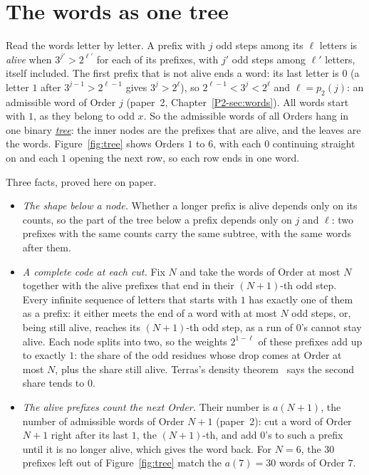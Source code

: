 \documentclass[10pt,a4paper,titlepage]{article}
\makeatletter
\newcommand{\termhere}[1]{\leavevmode
  \Hy@raisedlink{\hyper@anchorstart{term:#1}\hyper@anchorend}}
\newcommand{\keyterm}[2]{\hyperlink{box:#1}{\emph{#2}}}
\makeatother
\begin{document}
\section{The words as one tree}
\label{sec:tree}

\termhere{tree}Read the words letter by letter. A prefix with $j$ odd steps among its $\ell$ letters is \emph{alive}
when $3^{j'} > 2^{\ell'}$ for each of its prefixes, with $j'$ odd steps among $\ell'$ letters, itself included.
The first prefix that is not alive ends a word: its last letter is $0$ (a letter $1$ after
$3^{j-1} > 2^{\ell-1}$ gives $3^j > 2^\ell$), so $2^{\ell-1} < 3^j < 2^\ell$ and $\ell = p_2(j)$:
an admissible word of Order $j$ (paper~2, Chapter~\ref{P2-sec:words}). All words start with $1$, as
they belong to odd $x$. So the admissible words of all Orders hang in one binary
\keyterm{tree}{tree}: the inner nodes are the prefixes that are alive, and the leaves are the words.
Figure~\ref{fig:tree} shows Orders $1$ to $6$, with each $0$ continuing straight on and each
$1$ opening the next row, so each row ends in one word.

Three facts, proved here on paper.
\begin{itemize}
\item \emph{The shape below a node.} Whether a longer prefix is alive depends only on its
counts, so the part of the tree below a prefix depends only on $j$ and $\ell$: two prefixes with the same
counts carry the same subtree, with the same words after them.
\item \emph{A complete code at each cut.} Fix $N$ and take the words of Order at most $N$ together with the
alive prefixes that end in their $(N+1)$-th odd step. Every infinite sequence of letters
that starts with $1$ has exactly one of them as a prefix: it either meets the end of a word with at most $N$ odd steps, or, being
still alive, reaches its $(N+1)$-th odd step, as a run of $0$'s cannot stay alive. Each node
splits into two, so the weights $2^{1-\ell}$ of these prefixes add up to exactly $1$: the
share of the odd residues whose drop comes at Order at most $N$, plus the share still alive.
Terras's density theorem~\cite{Terras1976} says the second share tends to $0$.
\item \emph{The alive prefixes count the next Order.} Their number is $a(N+1)$, the number of
admissible words of Order $N + 1$ (paper~2): cut a word of Order $N+1$ right after its last $1$, the $(N+1)$-th, and
add $0$'s to such a prefix until it is no longer alive, which gives the word back. For $N = 6$, the
$30$ prefixes left out of Figure~\ref{fig:tree} match the $a(7) = 30$ words of Order $7$.
\end{itemize}
\end{document}
